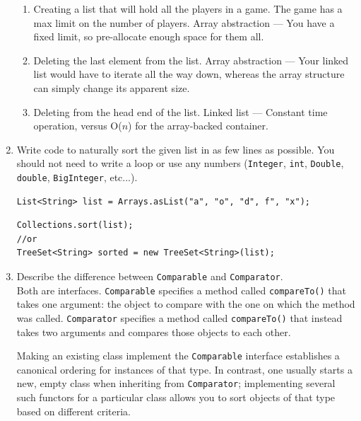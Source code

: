 \documentclass[11pt]{article}
\newenvironment{answer}{\large\lstset{basicstyle=\tiny\ttfamily}\color{white} }{}
\newenvironment{answer}{\large\lstset{basicstyle=\large\ttfamily}\color{red} }{}
\begin{document}
\begin{enumerate}
\begin{enumerate}
	\item Creating a list that will hold all the players in a game.  The game has a max limit on the number of players.
	\begin{answer}
	Array abstraction --- You have a fixed limit, so pre-allocate enough space for them all.
	\end{answer}

	\item Deleting the last element from the list.
	\begin{answer}
	Array abstraction --- Your linked list would have to iterate all the way down, whereas the array structure can simply change its apparent size.
	\end{answer}
			
	\item Deleting from the head end of the list.
	\begin{answer}
	Linked list --- Constant time operation, versus O($n$) for the array-backed container.
	\end{answer}
\end{enumerate}  


\vspace{24pt}
\item Write code to naturally sort the given list in as few lines as possible. You should not need to write a loop or use any numbers (\texttt{Integer}, \texttt{int}, \texttt{Double}, \texttt{double},
\texttt{BigInteger}, etc...).
\begin{verbatim}
List<String> list = Arrays.asList("a", "o", "d", f", "x");
\end{verbatim}
\begin{answer}
\begin{verbatim}
Collections.sort(list);
//or
TreeSet<String> sorted = new TreeSet<String>(list);
\end{verbatim}
\end{answer}


\item Describe the difference between \texttt{Comparable} and \texttt{Comparator}. \\
\begin{answer}
Both are interfaces.
\texttt{Comparable} specifies a method called \texttt{compareTo()} that takes one argument: the object to compare with the one on which the method was called.
\texttt{Comparator} specifies a method called \texttt{compareTo()} that instead takes two arguments and compares those objects to each other.

Making an existing class implement the \texttt{Comparable} interface establishes a canonical ordering for instances of that type.
In contrast, one usually starts a new, empty class when inheriting from \texttt{Comparator}; implementing several such functors for a particular class allows you to sort objects of that type based on different criteria.
\end{answer}



\end{enumerate}
\end{document}
